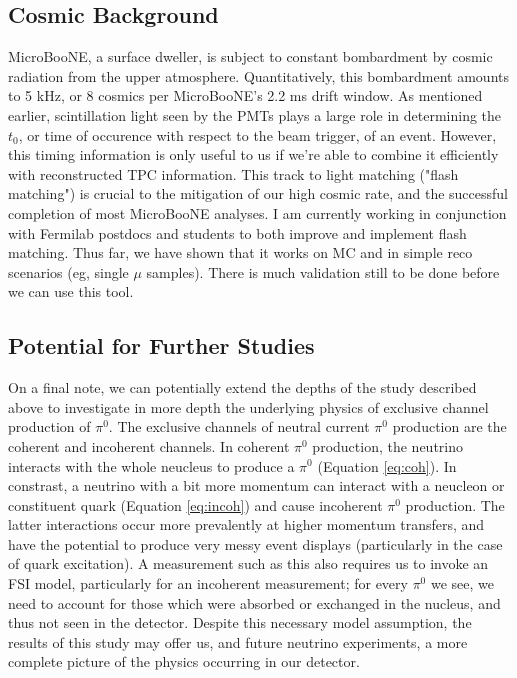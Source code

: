 \documentclass[12pt]{article}
\begin{document}
\subsection{Cosmic Background}
MicroBooNE, a surface dweller, is subject to constant bombardment by cosmic radiation from the upper atmosphere. Quantitatively, this bombardment amounts to 5 kHz, or 8 cosmics per MicroBooNE's 2.2 ms drift window. As mentioned earlier, scintillation light seen by the PMTs plays a large role in determining the $t_0$, or time of occurence with respect to the beam trigger, of an event. However, this timing information is only useful to us if we're able to combine it efficiently with reconstructed TPC information. This track to light matching ("flash matching") is crucial to the mitigation of our high cosmic rate, and the successful completion of most MicroBooNE analyses. I am currently working in conjunction with Fermilab postdocs and students to both improve and implement flash matching.  Thus far, we have shown that it works on MC and in simple reco scenarios (eg, single $\mu$ samples).  There is much validation still to be done before we can use this tool.

\subsection{Potential for Further Studies}

\par On a final note, we can potentially extend the depths of the study described above to investigate in more depth the underlying physics of exclusive channel production of $\pi^0$. The exclusive channels of neutral current $\pi^0$ production are the coherent and incoherent channels.  In coherent $\pi^0$ production, the neutrino interacts with the whole neucleus to produce a $\pi^0$ (Equation \ref{eq:coh}). In constrast, a neutrino with a bit more momentum can interact with a neucleon or constituent quark (Equation \ref{eq:incoh}) and cause incoherent $\pi^0$ production. The latter interactions occur more prevalently at higher momentum transfers, and have the potential to produce very messy event displays (particularly in the case of quark excitation). A measurement such as this also requires us to invoke an FSI model, particularly for an incoherent measurement; for every $\pi^0$ we see, we need to account for those which were absorbed or exchanged in the nucleus, and thus not seen in the detector. Despite this necessary model assumption, the results of this study may offer us, and future neutrino experiments, a more complete picture of the physics occurring in our detector. 
\end{document}
